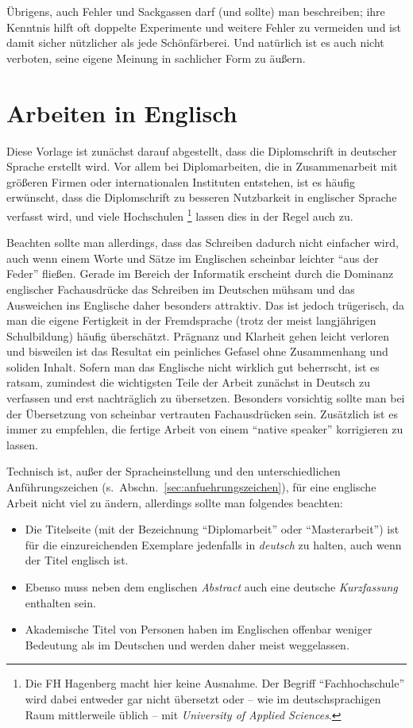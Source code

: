 Übrigens, auch Fehler und Sackgassen darf (und sollte) man
beschreiben; ihre Kenntnis hilft oft doppelte Experimente und
weitere Fehler zu vermeiden und ist damit sicher nützlicher als
jede Schönfärberei.
Und natürlich ist es auch nicht verboten, seine eigene Meinung 
in sachlicher Form zu äußern.


\section{Arbeiten in Englisch}
\label{sec:englisch}

Diese Vorlage ist zunächst darauf abgestellt, dass die
Diplomschrift in deutscher Sprache erstellt wird. Vor allem bei
Diplomarbeiten, die in Zusammenarbeit mit größeren Firmen oder
internationalen Instituten entstehen, ist es häufig erwünscht,
dass die Diplomschrift zu besseren Nutzbarkeit in englischer
Sprache verfasst wird, und viele Hochschulen%
\footnote{Die FH Hagenberg macht hier keine Ausnahme. 
Der Begriff "`Fachhochschule"' wird dabei entweder gar nicht
übersetzt oder -- wie im deutschsprachigen Raum mittlerweile üblich -- 
mit \emph{University of Applied Sciences}.
} 
lassen dies in
der Regel auch zu.

Beachten sollte man allerdings, dass das Schreiben dadurch nicht
einfacher wird, auch wenn einem Worte und Sätze im Englischen
scheinbar leichter "`aus der Feder"' fließen. Gerade im Bereich
der Informatik erscheint durch die Dominanz englischer
Fachausdrücke das Schreiben im Deutschen mühsam und das Ausweichen
ins Englische daher besonders attraktiv. Das ist jedoch
trügerisch, da man die eigene Fertigkeit in der Fremdsprache
(trotz der meist langjährigen Schulbildung) häufig überschätzt.
Prägnanz und Klarheit gehen leicht verloren und bisweilen ist das
Resultat ein peinliches Gefasel ohne Zusammenhang und soliden
Inhalt. Sofern man das Englische nicht wirklich gut beherrscht, ist
es ratsam, zumindest die wichtigsten Teile der Arbeit zunächst in
Deutsch zu verfassen und erst nachträglich zu übersetzen.
Besonders vorsichtig sollte man bei der Übersetzung von scheinbar
vertrauten Fachausdrücken sein. Zusätzlich ist es immer zu
empfehlen, die fertige Arbeit von einem "`native speaker"'
korrigieren zu lassen.



Technisch ist, außer der Spracheinstellung und den
unterschiedlichen Anführungszeichen (s.\
Abschn.~\ref{sec:anfuehrungszeichen}), für eine englische Arbeit
nicht viel zu ändern, allerdings sollte man folgendes beachten:
%
\begin{itemize}
\item  Die Titelseite (mit der Bezeichnung "`Diplomarbeit"' oder "`Masterarbeit"') 
ist für die einzureichenden Exemplare jedenfalls in \emph{deutsch} zu halten,
auch wenn der Titel englisch ist. 
\item Ebenso muss neben dem
englischen \emph{Abstract} auch eine deutsche \emph{Kurzfassung}
enthalten sein. %
\item Akademische Titel von Personen haben im Englischen offenbar
weniger Bedeutung als im Deutschen und werden daher meist
weggelassen.
\end{itemize}
